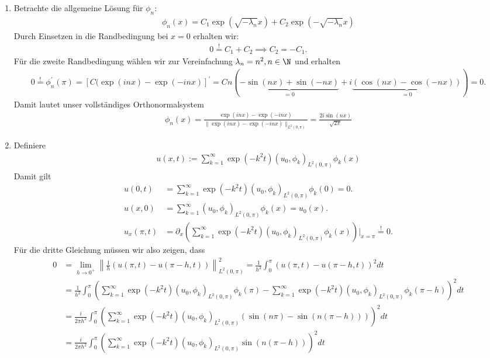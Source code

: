 \begin{solution}

\phantom{}
\begin{enumerate}
  \item Betrachte die allgemeine Lösung für $\phi_n$:
  \begin{align*}
    \phi_n(x) = C_1\exp(\sqrt{-\lambda_n}x) + C_2\exp(-\sqrt{-\lambda_n}x)
  \end{align*}
  Durch Einsetzen in die Randbedingung bei $x = 0$ erhalten wir:
  \begin{align*}
    0 \stackrel{!}{=} C_1 + C_2 \implies C_2 = -C_1.
  \end{align*}
  Für die zweite Randbedingung wählen wir zur Vereinfachung $\lambda_n = n^2, n \in \N$
  und erhalten
  \begin{align}
    0 \stackrel{!}{=} \phi^{\prime}_n(\pi) = [C(\exp(inx) - \exp(-inx)]^{\prime}
    = Cn(\underbrace{-\sin(nx) + \sin(-nx)}_{=0} + i\underbrace{(\cos(nx) - \cos(-nx))}_{=0}) = 0.
  \end{align}
  Damit lautet unser vollständiges Orthonormalsystem
  \begin{align*}
    \phi_n(x) = \frac{\exp(inx) - \exp(-inx)}{\|\exp(inx) - \exp(-inx)\|_{L^2(0,\pi)}}
    = \frac{2i\sin(nx)}{\sqrt{2\pi}}
  \end{align*}
  \item Definiere
  \begin{align*}
    u(x,t) := \sum_{k=1}^{\infty}\exp(-k^2t)(u_0,\phi_k)_{L^2(0,\pi)}\phi_k(x)
  \end{align*}
  Damit gilt
  \begin{align*}
    u(0,t) &= \sum_{k=1}^{\infty}\exp(-k^2t)(u_0,\phi_k)_{L^2(0,\pi)}\phi_k(0) = 0. \\
    u(x,0) &= \sum_{k=1}^{\infty}(u_0,\phi_k)_{L^2(0,\pi)}\phi_k(x) = u_0(x). \\
    u_x(\pi,t) &= \partial_x\left(\sum_{k=1}^{\infty}\exp(-k^2t)(u_0,\phi_k)_{L^2(0,\pi)}\phi_k(x)\right)\Bigg|_{x=\pi} \stackrel{!}{=} 0.
  \end{align*}
  Für die dritte Gleichung müssen wir also zeigen, dass
  \begin{align*}
    0 &= \lim_{h \to 0^+}\left\|\frac{1}{h}(u(\pi,t) - u(\pi - h,t))\right\|_{L^2(0,\pi)}^2
    = \frac{1}{h^2}\int_0^{\pi}(u(\pi,t) -  u(\pi -h,t))^2 dt \\
    &= \frac{1}{h^2}\int_0^{\pi}\left(\sum_{k=1}^{\infty}\exp(-k^2t)(u_0,\phi_k)_{L^2(0,\pi)}\phi_k(\pi) -  \sum_{k=1}^{\infty}\exp(-k^2t)(u_0,\phi_k)_{L^2(0,\pi)}\phi_k(\pi - h)\right)^2 dt \\
    &= \frac{i}{2\pi h^2}\int_0^{\pi}\left(\sum_{k=1}^{\infty}
    \exp(-k^2t)(u_0,\phi_k)_{L^2(0,\pi)}(\sin(n\pi) - \sin(n(\pi-h)))\right)^2 dt \\
    &= \frac{i}{2\pi h^2}\int_0^{\pi}\left(\sum_{k=1}^{\infty}
    \exp(-k^2t)(u_0,\phi_k)_{L^2(0,\pi)}\sin(n(\pi-h))\right)^2 dt \\
  \end{align*}
\end{enumerate}
\end{solution}

